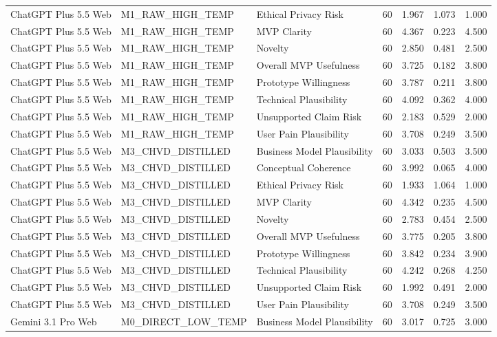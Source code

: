 \documentclass[10pt]{article}
\begin{document}
\begin{landscape}
\begin{longtable}{lllrrrr}
ChatGPT Plus 5.5 Web & M1\_RAW\_HIGH\_TEMP & Ethical Privacy Risk & 60 & 1.967 & 1.073 & 1.000 \\
ChatGPT Plus 5.5 Web & M1\_RAW\_HIGH\_TEMP & MVP Clarity & 60 & 4.367 & 0.223 & 4.500 \\
ChatGPT Plus 5.5 Web & M1\_RAW\_HIGH\_TEMP & Novelty & 60 & 2.850 & 0.481 & 2.500 \\
ChatGPT Plus 5.5 Web & M1\_RAW\_HIGH\_TEMP & Overall MVP Usefulness & 60 & 3.725 & 0.182 & 3.800 \\
ChatGPT Plus 5.5 Web & M1\_RAW\_HIGH\_TEMP & Prototype Willingness & 60 & 3.787 & 0.211 & 3.800 \\
ChatGPT Plus 5.5 Web & M1\_RAW\_HIGH\_TEMP & Technical Plausibility & 60 & 4.092 & 0.362 & 4.000 \\
ChatGPT Plus 5.5 Web & M1\_RAW\_HIGH\_TEMP & Unsupported Claim Risk & 60 & 2.183 & 0.529 & 2.000 \\
ChatGPT Plus 5.5 Web & M1\_RAW\_HIGH\_TEMP & User Pain Plausibility & 60 & 3.708 & 0.249 & 3.500 \\
ChatGPT Plus 5.5 Web & M3\_CHVD\_DISTILLED & Business Model Plausibility & 60 & 3.033 & 0.503 & 3.500 \\
ChatGPT Plus 5.5 Web & M3\_CHVD\_DISTILLED & Conceptual Coherence & 60 & 3.992 & 0.065 & 4.000 \\
ChatGPT Plus 5.5 Web & M3\_CHVD\_DISTILLED & Ethical Privacy Risk & 60 & 1.933 & 1.064 & 1.000 \\
ChatGPT Plus 5.5 Web & M3\_CHVD\_DISTILLED & MVP Clarity & 60 & 4.342 & 0.235 & 4.500 \\
ChatGPT Plus 5.5 Web & M3\_CHVD\_DISTILLED & Novelty & 60 & 2.783 & 0.454 & 2.500 \\
ChatGPT Plus 5.5 Web & M3\_CHVD\_DISTILLED & Overall MVP Usefulness & 60 & 3.775 & 0.205 & 3.800 \\
ChatGPT Plus 5.5 Web & M3\_CHVD\_DISTILLED & Prototype Willingness & 60 & 3.842 & 0.234 & 3.900 \\
ChatGPT Plus 5.5 Web & M3\_CHVD\_DISTILLED & Technical Plausibility & 60 & 4.242 & 0.268 & 4.250 \\
ChatGPT Plus 5.5 Web & M3\_CHVD\_DISTILLED & Unsupported Claim Risk & 60 & 1.992 & 0.491 & 2.000 \\
ChatGPT Plus 5.5 Web & M3\_CHVD\_DISTILLED & User Pain Plausibility & 60 & 3.708 & 0.249 & 3.500 \\
Gemini 3.1 Pro Web & M0\_DIRECT\_LOW\_TEMP & Business Model Plausibility & 60 & 3.017 & 0.725 & 3.000 \\

\end{longtable}
\end{landscape}
\end{document}
